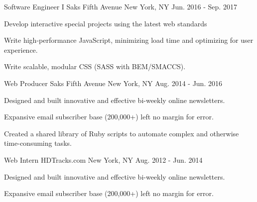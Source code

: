 \begin{cventries}
  \cventry
    {Software Engineer I} %
    {Saks Fifth Avenue} %
    {New York, NY} %
    {Jun. 2016 - Sep. 2017} %
    {
      \begin{cvitems} %
       \item {Develop interactive special projects using the latest web standards}
       \item {Write high-performance JavaScript, minimizing load time and optimizing for user experience.}
       \item {Write scalable, modular CSS (SASS with BEM/SMACCS).}
      \end{cvitems}
    }    

  \cventry
    {Web Producer} %
    {Saks Fifth Avenue} %
    {New York, NY} %
    {Aug. 2014 - Jun. 2016} %
    {
      \begin{cvitems} %
        \item {Designed and built innovative and effective bi-weekly online newsletters.}
        \item {Expansive email subscriber base (200,000+) left no margin for error.}
        \item {Created a shared library of Ruby scripts to automate complex and otherwise time-consuming tasks.}
      \end{cvitems}
    }

  \cventry
    {Web Intern} %
    {HDTracks.com} %
    {New York, NY} %
    {Aug. 2012 - Jun. 2014} %
    {
      \begin{cvitems} %
        \item {Designed and built innovative and effective bi-weekly online newsletters.}
        \item {Expansive email subscriber base (200,000+) left no margin for error.}
      \end{cvitems}
    }


\end{cventries}
